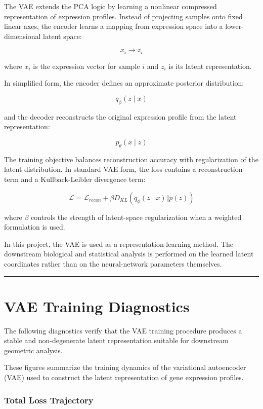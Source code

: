 \documentclass[
  letterpaper,
  DIV=11,
  numbers=noendperiod,
  openany,
  oneside]{scrreprt}
\begin{document}
The VAE extends the PCA logic by learning a nonlinear compressed
representation of expression profiles. Instead of projecting samples
onto fixed linear axes, the encoder learns a mapping from expression
space into a lower-dimensional latent space:

\[
x_i \rightarrow z_i
\]

where \(x_i\) is the expression vector for sample \(i\) and \(z_i\) is
its latent representation.

In simplified form, the encoder defines an approximate posterior
distribution:

\[
q_{\phi}(z \mid x)
\]

and the decoder reconstructs the original expression profile from the
latent representation:

\[
p_{\theta}(x \mid z)
\]

The training objective balances reconstruction accuracy with
regularization of the latent distribution. In standard VAE form, the
loss contains a reconstruction term and a Kullback-Leibler divergence
term:

\[
\mathcal{L} = \mathcal{L}_{recon} + \beta D_{KL}\left(q_{\phi}(z \mid x) \Vert p(z)\right)
\]

where \(\beta\) controls the strength of latent-space regularization
when a weighted formulation is used.

In this project, the VAE is used as a representation-learning method.
The downstream biological and statistical analysis is performed on the
learned latent coordinates rather than on the neural-network parameters
themselves.

\begin{center}\rule{0.5\linewidth}{0.5pt}\end{center}

\section{VAE Training Diagnostics}\label{vae-training-diagnostics}

The following diagnostics verify that the VAE training procedure
produces a stable and non-degenerate latent representation suitable for
downstream geometric analysis.

These figures summarize the training dynamics of the variational
autoencoder (VAE) used to construct the latent representation of gene
expression profiles.

\subsubsection{Total Loss Trajectory}\label{total-loss-trajectory}
\end{document}
